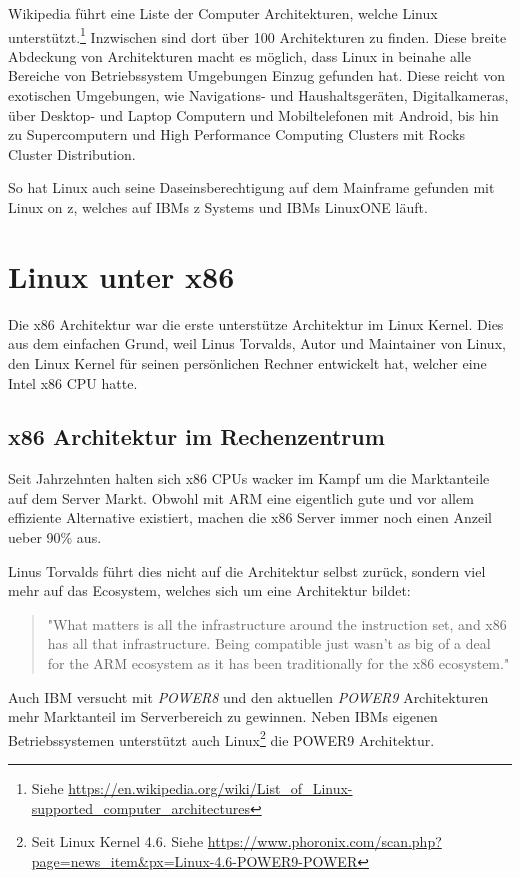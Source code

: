 Wikipedia führt eine Liste der Computer Architekturen, welche Linux unterstützt.\footnote{Siehe \url{https://en.wikipedia.org/wiki/List_of_Linux-supported_computer_architectures}}
Inzwischen sind dort über 100 Architekturen zu finden. Diese breite Abdeckung von Architekturen macht es möglich, dass Linux in beinahe alle Bereiche von Betriebssystem Umgebungen Einzug gefunden hat. Diese reicht von exotischen Umgebungen, wie Navigations- und Haushaltsgeräten, Digitalkameras, über Desktop- und Laptop Computern und Mobiltelefonen mit Android, bis hin zu Supercomputern und High Performance Computing Clusters mit Rocks Cluster Distribution.

So hat Linux auch seine Daseinsberechtigung auf dem Mainframe gefunden mit Linux on z, welches auf IBMs z Systems und IBMs LinuxONE läuft.

\section{Linux unter x86}
\label{sec:LinuxOnx86}

Die x86 Architektur war die erste unterstütze Architektur im Linux Kernel.
Dies aus dem einfachen Grund, weil Linus Torvalds, Autor und Maintainer von Linux, den Linux Kernel für seinen persönlichen Rechner entwickelt hat,
welcher eine Intel x86 CPU hatte.

\subsection{x86 Architektur im Rechenzentrum}

Seit Jahrzehnten halten sich x86 CPUs wacker im Kampf um die Marktanteile auf dem Server Markt.
Obwohl mit ARM eine eigentlich gute und vor allem effiziente Alternative existiert, machen die x86 Server immer noch einen Anzeil ueber 90\% aus.\cite{ARMServer}\cite{CommonWhyx86}

Linus Torvalds führt dies nicht auf die Architektur selbst zurück, sondern viel mehr auf das Ecosystem, welches sich um eine Architektur bildet:

\begin{quote}
"What matters is all the infrastructure around the instruction set, and x86 has all that infrastructure.
Being compatible just wasn’t as big of a deal for the ARM ecosystem as it has been traditionally for the x86 ecosystem."\cite{TorvalsQuote}
\end{quote}

Auch IBM versucht mit \textit{POWER8} und den aktuellen \textit{POWER9} Architekturen mehr Marktanteil im Serverbereich zu gewinnen.\cite{CommonWhyx86}
Neben IBMs eigenen Betriebssystemen unterstützt auch Linux\footnote{Seit Linux Kernel 4.6. Siehe \url{https://www.phoronix.com/scan.php?page=news_item&px=Linux-4.6-POWER9-POWER}} die POWER9 Architektur.
